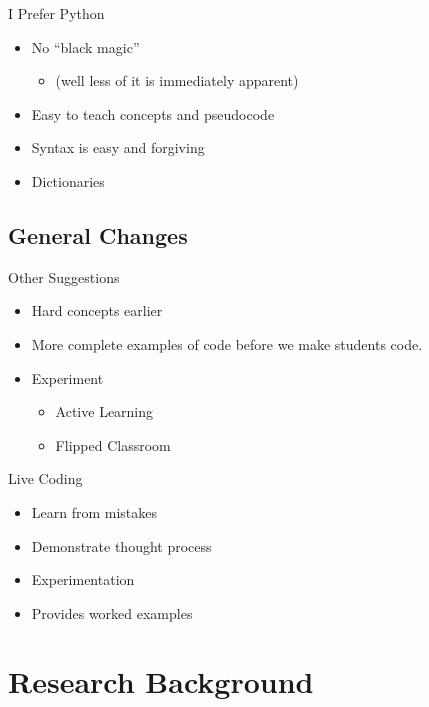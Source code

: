 \documentclass[11pt]{beamer}
\begin{document}
\begin{frame}{I Prefer Python}
	\begin{itemize}
		\item No ``black magic'' 
		\begin{itemize}
			\item (well less of it is immediately apparent)
		\end{itemize}
		\item Easy to teach concepts and pseudocode 
		\item Syntax is easy and forgiving
		\item Dictionaries
	\end{itemize}
\end{frame}



\subsection{General Changes}

\begin{frame}{Other Suggestions}
	\begin{itemize}
	\item Hard concepts earlier
	\item More complete examples of code before we make students code.
	\item Experiment
		\begin{itemize}
			\item Active Learning
			\item Flipped Classroom
		\end{itemize}
	\end{itemize}
		
\end{frame}

\begin{frame}{Live Coding}
	\begin{itemize}
		\item Learn from mistakes
		\item Demonstrate thought process
		\item Experimentation
		\item Provides worked examples 
		
	\end{itemize}
\end{frame}


\section{Research Background}
\end{document}
